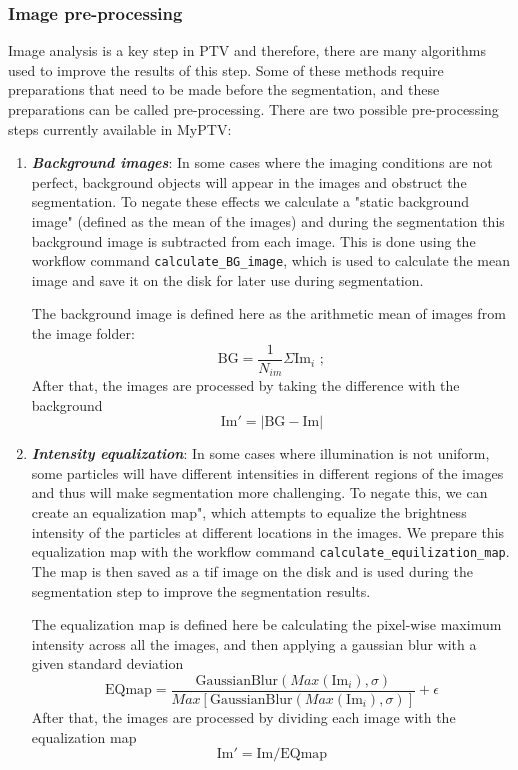\documentclass[10pt,a4paper]{article}
\begin{document}
\subsubsection{Image pre-processing}\label{sec:preprocessing}
Image analysis is a key step in PTV and therefore, there are many algorithms used to improve the results of this step. Some of these methods require preparations that need to be made before the segmentation, and these preparations can be called pre-processing. There are two possible pre-processing steps currently available in MyPTV: 
\begin{enumerate}
	\item \textbf{\textit{Background images}}: In some cases where the imaging conditions are not perfect, background objects will appear in the images and obstruct the segmentation. To negate these effects we calculate a "static background image" (defined as the mean of the images) and during the segmentation this background image is subtracted from each image. This is done using the  workflow command \texttt{calculate\_BG\_image}, which is used to calculate the mean image and save it on the disk for later use during segmentation.
	
	The background image is defined here as the arithmetic mean of images from the image folder: 
	\begin{equation}
	\mathrm{BG} = \frac{1}{N_{im}}\Sigma \mathrm{Im}_i \,\, ;
	\end{equation}
	After that, the images are processed by taking the difference with the background
	\begin{equation}
	\mathrm{Im}' = |\mathrm{BG} - \mathrm{Im}|
	\end{equation}
	
	\item \textbf{\textit{Intensity equalization}}: In some cases where illumination is not uniform, some particles will have different intensities in different regions of the images and thus will make segmentation more challenging. To negate this, we can create an equalization map", which attempts to equalize the brightness intensity of the particles at different locations in the images. We prepare this equalization map with the workflow command \texttt{calculate\_equilization\_map}. The map is then saved as a tif image on the disk and is used during the segmentation step to improve the segmentation results. 
	
	The equalization map is defined here be calculating the pixel-wise maximum intensity across all the images, and then applying a gaussian blur with a given standard deviation
	\begin{equation}
	\mathrm{EQmap} = \frac{\mathrm{GaussianBlur}(Max(\mathrm{Im}_i), \sigma)}{Max\left[ \mathrm{GaussianBlur}(Max(\mathrm{Im}_i), \sigma) \right]} + \epsilon
	\end{equation}
	After that, the images are processed by dividing each image with the equalization map
	\begin{equation}
	\mathrm{Im}' = \mathrm{Im} / \mathrm{EQmap} 
	\end{equation}
\end{enumerate}
\end{document}

